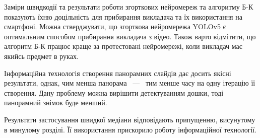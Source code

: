 \chapterConclusion

Заміри швидкодії та результати роботи згорткових нейромереж та алгоритму Б-К показують
їхню доцільність для прибирання викладача та їх використання на смартфоні. 
Можна стверджувати, що згорткова нейромережа YOLOv5 є оптимальним способом
прибирання викладача з відео. Також варто відмітити, що алгоритм Б-К
працює краще за протестовані нейромережі,
коли викладач має якийсь предмет в руках. 


Інформаційна технологія створення панорамних слайдів дає досить якісні результати, 
однак, чим менша панорама ~---~ тим менше часу на одну ітерацію її створення. Дану проблему 
можна вирішити детектуванням дошки, тоді панорамний знімок буде менший. 

Результати застосування швидкої медіани відповідають припущенню, висунутому в минулому розділі.
Її використання прискорило роботу інформаційної технології. 
